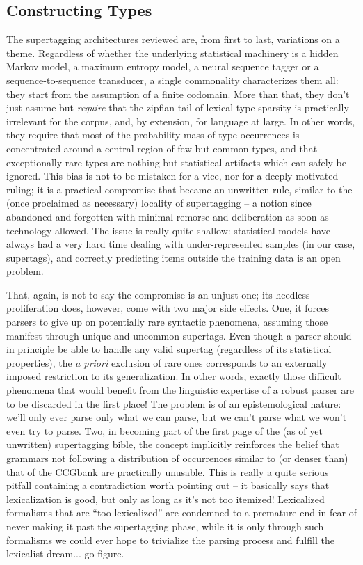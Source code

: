 \subsection{Constructing Types}
The supertagging architectures reviewed are, from first to last, variations on a theme.
Regardless of whether the underlying statistical machinery is a hidden Markov model, a maximum entropy model, a neural sequence tagger or a sequence-to-sequence transducer, a single commonality characterizes them all: they start from the assumption of a finite codomain.
More than that, they don't just assume but \textit{require} that the zipfian tail of lexical type sparsity is practically irrelevant for the corpus, and, by extension, for language at large.
In other words, they require that most of the probability mass of type occurrences is concentrated around a central region of few but common types, and that exceptionally rare types are nothing but statistical artifacts which can safely be ignored.
This bias is not to be mistaken for a vice, nor for a deeply motivated ruling; it is a practical compromise that became an unwritten rule, similar to the (once proclaimed as necessary) locality of supertagging -- a notion since abandoned and forgotten with minimal remorse and deliberation as soon as technology allowed.
The issue is really quite shallow: statistical models have always had a very hard time dealing with under-represented samples (in our case, supertags), and correctly predicting items outside the training data is an open problem.

That, again, is not to say the compromise is an unjust one; its heedless proliferation does, however, come with two major side effects.
One, it forces parsers to give up on potentially rare syntactic phenomena, assuming those manifest through unique and uncommon supertags.
Even though a parser should in principle be able to handle any valid supertag (regardless of its statistical properties), the \textit{a priori} exclusion of rare ones corresponds to an externally imposed restriction to its generalization.
In other words, exactly those difficult phenomena that would benefit from the linguistic expertise of a robust parser are to be discarded in the first place!
The problem is of an epistemological nature: we'll only ever parse only what we can parse, but we can't parse what we won't even try to parse.
Two, in becoming part of the first page of the (as of yet unwritten) supertagging bible, the concept implicitly reinforces the belief that grammars not following a distribution of occurrences similar to (or denser than) that of the CCGbank are practically unusable.
This is really a quite serious pitfall containing a contradiction worth pointing out -- it basically says that lexicalization is good, but only as long as it's not too itemized! 
Lexicalized formalisms that are ``too lexicalized'' are condemned to a premature end in fear of never making it past the supertagging phase, while it is only through such formalisms we could ever hope to trivialize the parsing process and fulfill the lexicalist dream... go figure.

